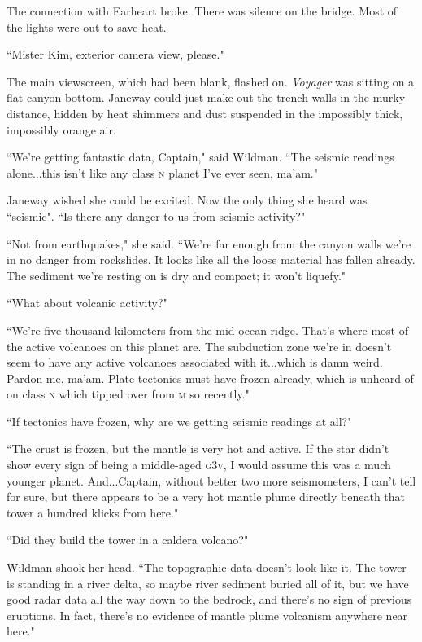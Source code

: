 \documentclass[twoside,letterpaper,12pt]{memoir}
\begin{document}
The connection with Earheart broke. There was silence on the bridge. Most of the lights were out to save heat.

``Mister Kim, exterior camera view, please."

The main viewscreen, which had been blank, flashed on. \textit{Voyager} was sitting on a flat canyon bottom. Janeway could just make out the trench walls in the murky distance, hidden by heat shimmers and dust suspended in the impossibly thick, impossibly orange air.

``We're getting fantastic data, Captain," said Wildman. ``The seismic readings alone...this isn't like any class \textsc{n} planet I've ever seen, ma'am."

Janeway wished she could be excited. Now the only thing she heard was ``seismic". ``Is there any danger to us from seismic activity?"

``Not from earthquakes," she said. ``We're far enough from the canyon walls we're in no danger from rockslides. It looks like all the loose material has fallen already. The sediment we're resting on is dry and compact; it won't liquefy."

``What about volcanic activity?"

``We're five thousand kilometers from the mid-ocean ridge. That's where most of the active volcanoes on this planet are. The subduction zone we're in doesn't seem to have any active volcanoes associated with it...which is damn weird. Pardon me, ma'am. Plate tectonics must have frozen already, which is unheard of on class \textsc{n} which tipped over from \textsc{m} so recently."

``If tectonics have frozen, why are we getting seismic readings at all?"

``The crust is frozen, but the mantle is very hot and active. If the star didn't show every sign of being a middle-aged \textsc{g3v}, I would assume this was a much younger planet. And...Captain, without better two more seismometers, I can't tell for sure, but there appears to be a very hot mantle plume directly beneath that tower a hundred klicks from here."

``Did they build the tower in a caldera volcano?"

Wildman shook her head. ``The topographic data doesn't look like it. The tower is standing in a river delta, so maybe river sediment buried all of it, but we have good radar data all the way down to the bedrock, and there's no sign of previous eruptions. In fact, there's no evidence of mantle plume volcanism anywhere near here."
\end{document}
